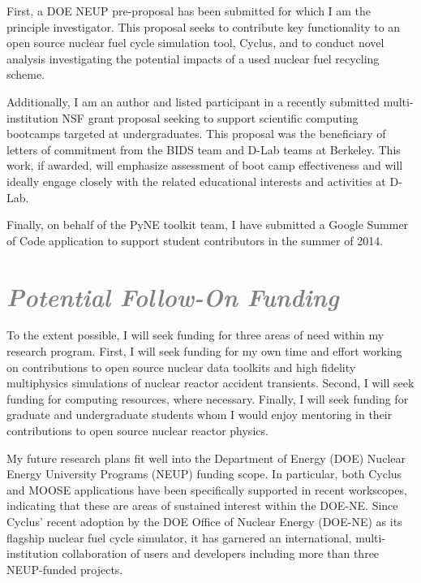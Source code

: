\documentclass[a4paper, 12pt]{article}
\begin{document}
First, a DOE NEUP pre-proposal has been submitted for which I am the principle
investigator. This proposal seeks to contribute key functionality to an open source
nuclear fuel cycle simulation tool, Cyclus, and to conduct novel analysis
investigating the potential impacts of a used nuclear fuel recycling scheme. 

Additionally, I am an author and listed participant in a recently submitted 
multi-institution NSF grant proposal seeking to support scientific computing 
bootcamps targeted at undergraduates. This proposal was the beneficiary of 
letters of commitment from the BIDS team and D-Lab teams at Berkeley. This work, 
if awarded, will emphasize assessment of boot camp effectiveness and will 
ideally engage closely with the related educational interests and activities at 
D-Lab.

Finally, on behalf of the PyNE toolkit team, I have submitted a Google Summer of 
Code application to support student contributors in the summer of 2014.

\section*{\textcolor{gray}{\it Potential Follow-On Funding }}

To the extent possible, I will seek funding for three areas of need within my 
research program. First, I will seek funding for my own time and effort working 
on contributions to open source nuclear data toolkits and high fidelity 
multiphysics simulations of nuclear reactor accident transients. Second, I will 
seek funding for computing resources, where necessary. Finally, I will seek 
funding for graduate and undergraduate students whom I would enjoy mentoring in 
their contributions to open source nuclear reactor physics.

My future research plans fit well into the Department of Energy (DOE) Nuclear 
Energy University Programs (NEUP) funding scope. In particular, both Cyclus and 
MOOSE applications have been specifically supported in recent workscopes, 
indicating that these are areas of sustained interest within the DOE-NE. 
Since Cyclus' recent adoption by the DOE Office of Nuclear Energy (DOE-NE)  as 
its flagship nuclear fuel cycle simulator, it has garnered an international, 
multi-institution collaboration of users and developers including more than 
three NEUP-funded projects. 
\end{document}
